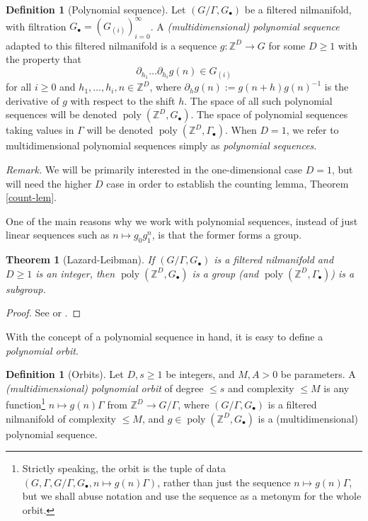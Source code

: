 \documentclass[11pt,reqno]{amsart}
\numberwithin{equation}{section}
\theoremstyle{plain}
\newtheorem{theorem}[subsection]{Theorem}
\theoremstyle{definition}
\newtheorem{definition}[subsection]{Definition}
\renewcommand{\leq}{\leqslant}
\renewcommand{\geq}{\geqslant}
\newcommand\Z{\mathbb{Z}}
\newcommand\1{{\bf 1}}
\newcommand\2{{\bf 2}}
\newcommand\poly{\operatorname{poly}}
\begin{document}
\begin{definition}[Polynomial sequence]  Let $(G/\Gamma,G_\bullet)$ be a filtered nilmanifold, with filtration $G_\bullet = (G_{(i)})_{i=0}^\infty$.  A \emph{\textup{(}multidimensional\textup{)} polynomial sequence} adapted to this filtered nilmanifold is a sequence $g: \Z^D \to G$ for some $D \geq 1$ with the property that 
$$ \partial_{h_1} \ldots \partial_{h_i} g(n) \in G_{(i)}$$
for all $i \geq 0$ and $h_1,\ldots,h_i,n \in \Z^D$, where $\partial_h g(n) := g(n+h) g(n)^{-1}$ is the derivative of $g$ with respect to the shift $h$.  The space of all such polynomial sequences will be denoted $\poly(\Z^D, G_\bullet)$.  The space of polynomial sequences taking values in $\Gamma$ will be denoted $\poly(\Z^D, \Gamma_\bullet)$.  When $D=1$, we refer to multidimensional polynomial sequences simply as \emph{polynomial sequences}.
\end{definition}

\emph{Remark.} We will be primarily interested in the one-dimensional case $D=1$, but will need the higher $D$ case in order to establish the counting lemma, Theorem \ref{count-lem}.

One of the main reasons why we work with polynomial sequences, instead of just linear sequences such as $n \mapsto g_0 g_1^n$, is that the former forms a group.

\begin{theorem}[Lazard-Leibman]\label{ll-thm}  If $(G/\Gamma,G_\bullet)$ is a filtered nilmanifold and $D \geq 1$ is an integer, then $\poly(\Z^D,G_\bullet)$ is a group \textup{(}and $\poly(\Z^D,\Gamma_\bullet)$\textup{)} is a subgroup.
\end{theorem}

\begin{proof} See \cite{leibman-group-2} or \cite[Proposition 6.2]{green-tao-nilratner}.  
\end{proof}

With the concept of a polynomial sequence in hand, it is easy to define a \emph{polynomial orbit}.

\begin{definition}[Orbits]  Let $D, s \geq 1$ be integers, and $M, A > 0$ be parameters.  A  \emph{\textup{(}multidimensional\textup{)} polynomial orbit} of degree $\leq s$ and complexity $\leq M$ is any function\footnote{Strictly speaking, the orbit is the tuple of data $(G, \Gamma, G/\Gamma, G_\bullet, n \mapsto g(n)\Gamma)$, rather than just the sequence $n \mapsto g(n) \Gamma$, but we shall abuse notation and use the sequence as a metonym for the whole orbit.} $n \mapsto g(n) \Gamma$ from $\Z^D \to G/\Gamma$, where $(G/\Gamma,G_\bullet)$ is a filtered nilmanifold of complexity $\leq M$, and $g \in \poly(\Z^D, G_\bullet)$ is a \textup{(}multidimensional\textup{)} polynomial sequence.  
\end{definition}
\end{document}
